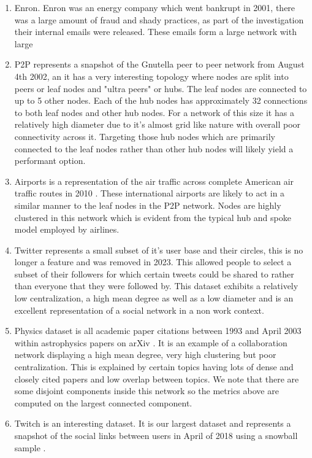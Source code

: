 \documentclass{article}
\begin{document}
\begin{enumerate}
	\item Enron. Enron was an energy company which went bankrupt in 2001, there was a large amount of fraud and shady practices, as part of the investigation their internal emails were released. These emails form a large network with large
	\item P2P represents a snapshot of the Gnutella peer to peer network from August 4th 2002, an it has a very interesting topology where nodes are split into peers or leaf nodes and "ultra peers" or hubs. The leaf nodes are connected to up to 5 other nodes. Each of the hub nodes has approximately 32 connections to both leaf nodes and other hub nodes. For a network of this size it has a relatively high diameter due to it's almost grid like nature with overall poor connectivity across it. Targeting those hub nodes which are primarily connected to the leaf nodes rather than other hub nodes will likely yield a performant option. \cite{snapnets}
	\item Airports is a representation of the air traffic across complete American air traffic routes in 2010 \cite{airports}. These international airports are likely to act in a similar manner to the leaf nodes in the P2P network. Nodes are highly clustered in this network which is evident from the typical hub and spoke model employed by airlines.
	\item Twitter represents a small subset of it's user base and their circles, this is no longer a feature and was removed in 2023. This allowed people to select a subset of their followers for which certain tweets could be shared to rather than everyone that they were followed by. This dataset exhibits a relatively low centralization, a high mean degree as well as a low diameter and is an excellent representation of a social network in a non work context.
	\item Physics dataset is all academic paper citations between 1993 and April 2003 within astrophysics papers on arXiv \cite{snapnets}. It is an example of a collaboration network displaying a high mean degree, very high clustering but poor centralization. This is explained by certain topics having lots of dense and closely cited papers and low overlap between topics. \cite{snapnets}
	      We note that there are some disjoint components inside this network so the metrics above are computed on the largest connected component.
	\item Twitch is an interesting dataset. It is our largest dataset and represents a snapshot of the social links between users in April of 2018 using a snowball sample \cite{Twitch}.
\end{enumerate}
\end{document}

